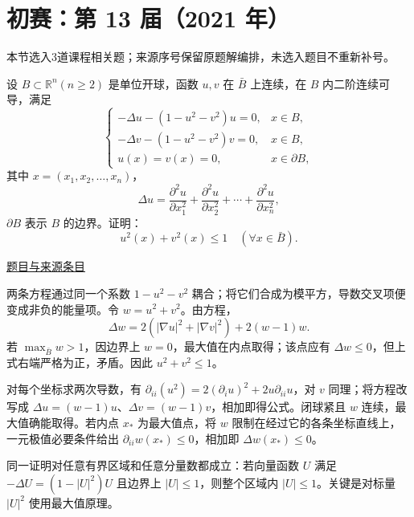 \documentclass[12pt,fontset=fandol]{ctexart}
\begin{document}
\section{初赛：第 13 届（2021 年）}

本节选入3道课程相关题；来源序号保留原题解编排，未选入题目不重新补号。

\begin{example}[来源序号2]\label{ex:ch07-13th-A:2}\label{pr:ch07-13th-A:2}

设 $B\subset\mathbb R^{n}(n\geq 2)$ 是单位开球，函数 $u,v$ 在 $\bar{B}$ 上连续，在 $B$ 内二阶连续可导，满足
\[
\begin{cases}-\Delta u-\left(1-u^{2}-v^{2}\right)u=0, & x\in B,\\ -\Delta v-\left(1-u^{2}-v^{2}\right)v=0, & x\in B,\\ u(x)=v(x)=0, & x\in\partial B,\end{cases}
\]
其中 $x=\left(x_{1},x_{2},\ldots,x_{n}\right)$，
\[
\Delta u=\frac{\partial^{2}u}{\partial x_{1}^{2}}+\frac{\partial^{2}u}{\partial x_{2}^{2}}+\cdots+\frac{\partial^{2}u}{\partial x_{n}^{2}},
\]
$\partial B$ 表示 $B$ 的边界。证明：
\[
u^{2}(x)+v^{2}(x)\leq 1\quad(\forall x\in\bar{B}).
\]

\par\href{https://github.com/lzxcr/cmc-mathematics/blob/64916fa1fdbc3e444a652eca204d5669058ee321/src/problems/preliminary/13/02.md}{题目与来源条目}

\end{example}

\begin{solve}\label{ans:ch07-13th-A:2}

两条方程通过同一个系数 $1-u^2-v^2$ 耦合；将它们合成为模平方，导数交叉项便变成非负的能量项。令 $w=u^2+v^2$。由方程，
\[
\Delta w=2(|\nabla u|^2+|\nabla v|^2)+2(w-1)w.
\]
若 $\max_{\bar B}w>1$，因边界上 $w=0$，最大值在内点取得；该点应有 $\Delta w\leq0$，但上式右端严格为正，矛盾。因此 $u^2+v^2\leq1$。

对每个坐标求两次导数，有 $\partial_{ii}(u^2)=2(\partial_i u)^2+2u\partial_{ii}u$，对 $v$ 同理；将方程改写成 $\Delta u=(w-1)u$、$\Delta v=(w-1)v$，相加即得公式。闭球紧且 $w$ 连续，最大值确能取得。若内点 $x_*$ 为最大值点，将 $w$ 限制在经过它的各条坐标直线上，一元极值必要条件给出 $\partial_{ii}w(x_*)\le0$，相加即 $\Delta w(x_*)\le0$。

\end{solve}

\begin{remark}[方法与条件]同一证明对任意有界区域和任意分量数都成立：若向量函数 $U$ 满足 $-\Delta U=(1-|U|^2)U$ 且边界上 $|U|\leq1$，则整个区域内 $|U|\leq1$。关键是对标量 $|U|^2$ 使用最大值原理。\end{remark}
\end{document}
